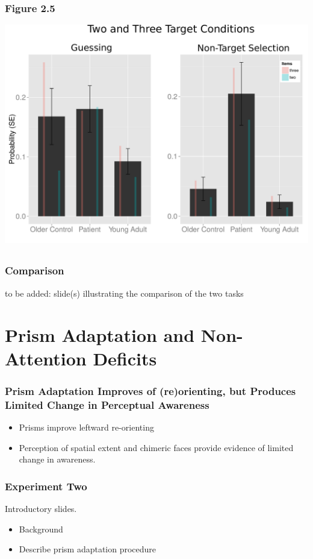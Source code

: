 \documentclass{beamer}
\begin{document}

\subsection*{}
\begin{frame}
	\frametitle{Comparison}
	to be added: slide(s) illustrating the comparison of the two tasks
\end{frame}



\section[Prisms]{Prism Adaptation and Non-Attention Deficits}

\begin{frame}
	\frametitle{Prism Adaptation Improves of (re)orienting, but Produces Limited Change in Perceptual Awareness}
	\begin{itemize}
		\item Prisms improve leftward re-orienting
		\item Perception of spatial extent and chimeric faces provide evidence of limited change in awareness.
	\end{itemize}
\end{frame}

\begin{frame}
	\frametitle{Experiment Two}
	Introductory slides.
	\begin{itemize}
		\item Background
		\item Describe prism adaptation procedure
	\end{itemize}

\end{frame}
\end{document}
